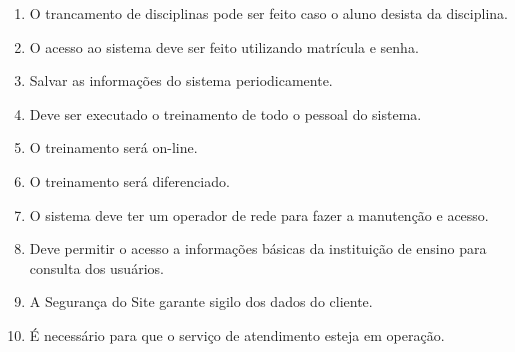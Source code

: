 \begin{enumerate}
\item O trancamento de disciplinas pode ser feito caso o aluno desista da disciplina.
\item O acesso ao sistema deve ser feito utilizando matrícula e senha.
\item Salvar as informações do sistema periodicamente.
\item Deve ser executado o treinamento de todo o pessoal do sistema.
\item O treinamento será on-line.
\item O treinamento será diferenciado.
\item O sistema deve ter um operador de rede para fazer a manutenção e acesso.
\item Deve permitir o acesso a informações básicas da instituição de ensino para consulta dos usuários.
\item A Segurança do Site garante sigilo dos dados do cliente.
\item É necessário para que o serviço de atendimento esteja em operação.

  \end{enumerate}
   
